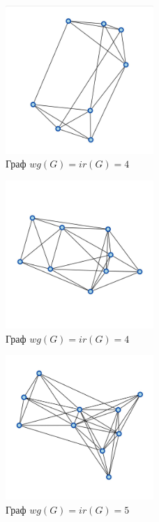 \documentclass[bachelor, och, nir]{SCWorks}
\begin{document}
\begin{figure}[ht!]  
    \centering 
    \includegraphics[width=0.5\textwidth]
{88.jpg}  
    \caption{Граф $wg(G) = ir(G) = 4$} 
    \label{fig:im3} 
\end{figure}

\begin{figure}[ht!]  
    \centering 
    \includegraphics[width=0.5\textwidth]
{999.jpg}  
    \caption{Граф $wg(G) = ir(G) = 4$} 
    \label{fig:im3} 
\end{figure}
\FloatBarrier

\begin{figure}[h!]  
    \centering 
    \includegraphics[width=0.5\textwidth]
{1010.jpg}  
    \caption{Граф $wg(G) = ir(G) = 5$} 
    \label{fig:im01} 
\end{figure}
\end{document}
